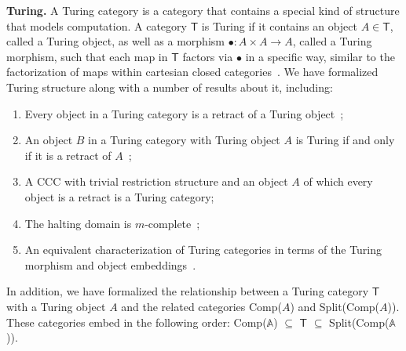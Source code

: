 \documentclass{entcs} \usepackage{entcsmacro}
\begin{document}

{\bfseries Turing.} A Turing category is a category that contains a special kind of structure that models computation. A category $\mathsf{T}$ is Turing if it contains an object $A \in \mathsf{T}$, called a Turing object, as well as a morphism $\bullet : A \times A \to A$, called a Turing morphism, such that each map in $\mathsf{T}$ factors via $\bullet$ in a specific way, similar to the factorization of maps within cartesian closed categories~\cite{HOCL}. We have formalized Turing structure along with a number of results about it, including:


\begin{enumerate}
\item Every object in a Turing category is a retract of a Turing object~\cite{Turing};
\item An object $B$ in a Turing category with Turing object $A$ is Turing if and only if it is a retract of $A$~\cite{Turing};
	
\item A CCC with trivial restriction structure and an object $A$ of which every object is a retract is a Turing category;
\item The halting domain is $m$-complete~\cite{Turing};
	
\item An equivalent characterization of Turing categories in terms of the Turing morphism and object embeddings~\cite{Turing}.
	
\end{enumerate}

In addition, we have formalized the relationship between a Turing category $\mathsf{T}$ with a Turing object $A$ and the related categories Comp($A$) and Split(Comp($A$)). These categories embed in the following order:
Comp($\mathbb{A}$) $\subseteq$ $\mathsf{T}$ $\subseteq$ Split(Comp($\mathbb{A}$)).
\end{document}
